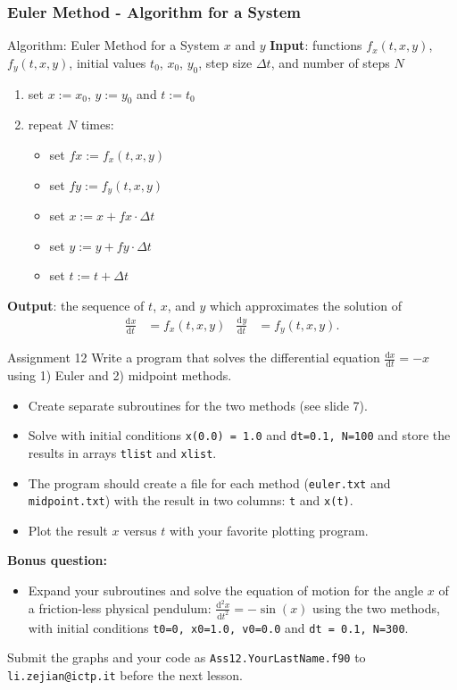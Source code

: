 \documentclass[11pt,aspectratio=169,handout]{beamer}
\newcommand{\dif}[3][]{\frac{\mathrm{d}^{#1}#3}{\mathrm{d}{#2}^{#1}}}
\begin{document}
\begin{frame}
\frametitle{Euler Method - Algorithm for a System}
\label{slide:euler-system}
\begin{block}{Algorithm: Euler Method for a System $x$ and $y$}
	\textbf{Input}: functions $f_x(t,x,y)$, $f_y(t,x,y)$, initial values $t_0$, $x_0$, $y_0$, step size $\Delta t$, and number of steps $N$
	\pause
	\begin{enumerate}
		\item set $x := x_0$, $y := y_0$ and $t := t_0$
		\item repeat $N$ times:
		\pause
		\begin{itemize}
			\item set $fx := f_x(t, x, y)$
			\item set $fy := f_y(t, x, y)$
			\pause
			\item set $x := x + fx \cdot \Delta t$
			\item set $y := y + fy \cdot \Delta t$
			\pause
			\item set $t := t + \Delta t$
		\end{itemize}		
	\end{enumerate}  
	\textbf{Output}: the sequence of $t$, $x$, and $y$ which approximates the solution of 
	\begin{align*}
		\dif{t}{x} &= f_x(t,x,y) & 
		\dif{t}{y} &= f_y(t,x,y).
	\end{align*}
\end{block}
\end{frame}

\begin{frame}{Assignment 12}
	Write a program that solves the differential equation $\frac{\mathrm{d} x}{\mathrm{d} t} = -x$ using 1) Euler and 2) midpoint methods.\pause
	\begin{itemize}
		\item Create separate subroutines for the two methods (see slide 7).\pause
		\item Solve with initial conditions \texttt{x(0.0) = 1.0} and \texttt{dt=0.1, N=100} and store the results in arrays \texttt{tlist} and \texttt{xlist}.\pause
		\item The program should create a file for each method (\texttt{euler.txt} and \texttt{midpoint.txt}) with the result in two columns: \texttt{t} and \texttt{x(t)}.\pause
		\item Plot the result $x$ versus $t$ with your favorite plotting program.\pause
		 
	\end{itemize}
\textbf{Bonus question:}
		\begin{itemize}
			\item Expand your subroutines and solve the equation of motion for the angle $x$ of a friction-less physical pendulum: $\frac{\mathrm{d}^2 x}{\mathrm{d} t^2} = -\sin(x)$ using the two methods, with initial conditions \texttt{t0=0, x0=1.0, v0=0.0} and \texttt{dt = 0.1, N=300}.
		\end{itemize}
		Submit the graphs and your code as \texttt{Ass12.YourLastName.f90} to \texttt{li.zejian@ictp.it} before the next lesson.
\end{frame}
\end{document}
